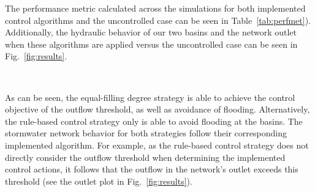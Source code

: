 The performance metric calculated across the simulations for both implemented control algorithms and the uncontrolled case can be seen in Table~\ref{tab:perfmet}). Additionally, the hydraulic behavior of our two basins and the network outlet when these algorithms are applied versus the uncontrolled case can be seen in Fig.~\ref{fig:results}.

\

As can be seen, the equal-filling degree strategy is able to achieve the control objective of the outflow threshold, as well as avoidance of flooding. Alternatively, the rule-based control strategy only is able to avoid flooding at the basins. The stormwater network behavior for both strategies follow their corresponding implemented algorithm. For example, as the rule-based control strategy does not directly consider the outflow threshold when determining the implemented control actions, it follows that the outflow in the network's outlet exceeds this threshold (see the outlet plot in Fig.~\ref{fig:results}). 

\

